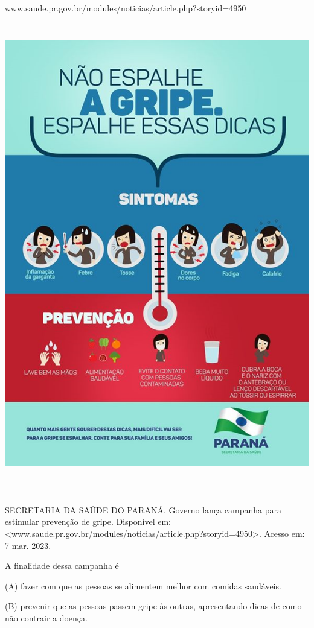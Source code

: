 \begin{itemize}
{{{\begin{itemize}
\begin{itemize}
www.saude.pr.gov.br/modules/noticias/article.php?storyid=4950\includegraphics[width=5.90694in,height=8.26736in]{media/image19.png}

SECRETARIA DA SAÚDE DO PARANÁ. Governo lança campanha para estimular
prevenção de gripe. Disponível em:
\textless{}www.saude.pr.gov.br/modules/noticias/article.php?storyid=4950\textgreater{}.
Acesso em: 7 mar. 2023.

A finalidade dessa campanha é

(A) fazer com que as pessoas se alimentem melhor com comidas saudáveis.

(B) prevenir que as pessoas passem gripe às outras, apresentando dicas
de como não contrair a doença.


\end{itemize}
\end{itemize}}}}
\end{itemize}
